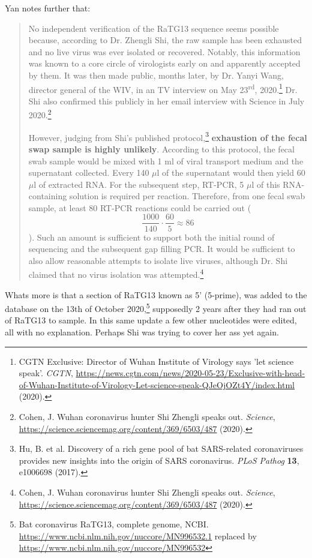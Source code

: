 \documentclass[11pt]{article}
\begin{document}
Yan notes further that:
\begin{quote}
No independent verification of the RaTG13 sequence seems possible because, according to Dr. Zhengli Shi, the raw sample has been exhausted and no live virus was ever isolated or recovered. Notably, this information was known to a core circle of virologists early on and apparently accepted by them. It was then made public, months later, by Dr. Yanyi Wang, director general of the WIV, in an TV interview on May 23\textsuperscript{rd}, 2020.\footnote{CGTN Exclusive: Director of Wuhan Institute of Virology says 'let science speak'. \emph{CGTN}, \url{https://news.cgtn.com/news/2020-05-23/Exclusive-with-head-of-Wuhan-Institute-of-Virology-Let-science-speak-QJeOjOZt4Y/index.html} (2020).} Dr. Shi also confirmed this publicly in her email interview with Science in July 2020.\footnote{Cohen, J. Wuhan coronavirus hunter Shi Zhengli speaks out. \emph{Science}, \url{https://science.sciencemag.org/content/369/6503/487} (2020).}

However, judging from Shi’s published protocol,\footnote{Hu, B. et al. Discovery of a rich gene pool of bat SARS-related coronaviruses provides new insights into the origin of SARS coronavirus. \emph{PLoS Pathog} \textbf{13}, e1006698 (2017).} \textbf{exhaustion of the fecal swap sample is highly unlikely}. According to this protocol, the fecal swab sample would be mixed with 1 ml of viral transport medium and the supernatant collected. Every 140 \(\mu\)​l of the supernatant would then yield 60 \(\mu\)​l of extracted RNA. For the subsequent step, RT-PCR, 5 \(\mu\)​l of this RNA-containing solution is required per reaction. Therefore, from one fecal swab sample, at least 80 RT-PCR reactions could be carried out ($$\frac{1000}{140} \cdot \frac{60}{5} \approx 86$$). Such an amount is sufficient to support both the initial round of sequencing and the subsequent gap filling PCR. It would be sufficient to also allow reasonable attempts to isolate live viruses, although Dr. Shi claimed that no virus isolation was attempted.\footnote{Cohen, J. Wuhan coronavirus hunter Shi Zhengli speaks out. \emph{Science}, \url{https://science.sciencemag.org/content/369/6503/487} (2020).}
\end{quote}

Whats more is that a section of RaTG13 known as 5' (5-prime), was added to the database on the 13th of October 2020,\footnote{Bat coronavirus RaTG13, complete genome, NCBI. \url{https://www.ncbi.nlm.nih.gov/nuccore/MN996532.1} replaced by \url{https://www.ncbi.nlm.nih.gov/nuccore/MN996532}} supposedly 2 years after they had ran out of RaTG13 to sample. In this same update a few other nucleotides were edited, all with no explanation. Perhaps Shi was trying to cover her ass yet again.
\end{document}
